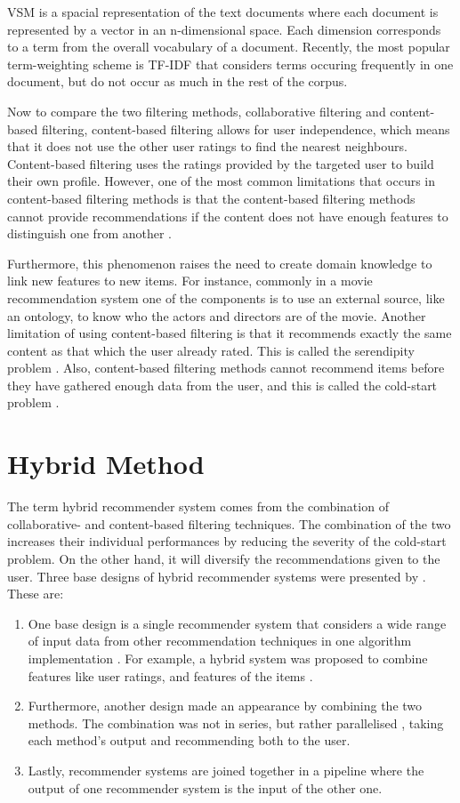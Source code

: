 VSM is a spacial representation of the text documents where each document is represented by a vector in an n-dimensional space. Each dimension corresponds to a term from the overall vocabulary of a document. Recently, the most popular term-weighting scheme is TF-IDF that considers terms occuring frequently in one document, but do not occur as much in the rest of the corpus.

Now to compare the two filtering methods, collaborative filtering and content-based filtering, content-based filtering allows for user independence, which means that it does not use the other user ratings to find the nearest neighbours. Content-based filtering uses the ratings provided by the targeted user to build their own profile. However, one of the most common limitations that occurs in content-based filtering methods is that the content-based filtering methods cannot provide recommendations if the content does not have enough features to distinguish one from another \cite{lops2011content}.

Furthermore, this phenomenon raises the need to create domain knowledge to link new features to new items. For instance, commonly in a movie recommendation system one of the components is to use an external source, like an ontology, to know who the actors and directors are of the movie. Another limitation of using content-based filtering is that it recommends exactly the same content as that which the user already rated. This is called the serendipity problem \cite{DEGEMMIS2015695}. Also, content-based filtering methods cannot recommend items before they have gathered enough data from the user, and this is called the cold-start problem \cite{LIKA20142065}.


\section{Hybrid Method}
The term hybrid recommender system comes from the combination of collaborative- and content-based filtering techniques. The combination of the two increases their individual performances by reducing the severity of the cold-start problem. On the other hand, it will diversify the recommendations given to the user. Three base designs of hybrid recommender systems were presented by . These are:

\begin{enumerate}
    \item One base design is a single recommender system that considers a wide range of input data from other recommendation techniques in one algorithm implementation \cite{dong2017hybrid}. For example, a hybrid system was proposed to combine features like user ratings, and features of the items \cite{basu1998recommendation}.
    \item Furthermore, another design made an appearance by combining the two methods. The combination was not in series, but rather parallelised \cite{sharma2016evolution}, taking each method’s output and recommending both to the user.
    \item Lastly, recommender systems are joined together in a pipeline where the output of one recommender system is the input of the other one.
\end{enumerate}

